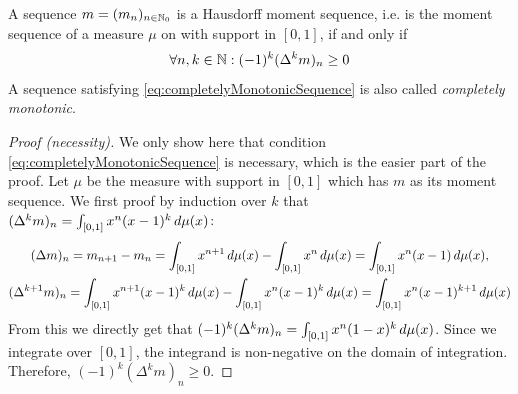 \documentclass[a4paper]{scrreprt}
\begin{document}
    \begin{thm}
        A sequence $m = (m_n)_{n \in \mathbb{N}_0}$ is a Hausdorff moment sequence, i.e. is the moment sequence of a measure $\mu$ on with support in $[0, 1]$,
        if and only if
        \begin{gather}
            \forall n, k \in \mathbb{N}: (-1)^k (\Delta^k m)_n \geq 0
            \label{eq:completelyMonotonicSequence}
        \end{gather}
        A sequence satisfying \eqref{eq:completelyMonotonicSequence} is also called \emph{completely monotonic}.
        \label{thm:hausdorffMomentSequenceCharacterization}
    \end{thm}
    \begin{proof}[Proof (necessity)]
        We only show here that condition \eqref{eq:completelyMonotonicSequence} is necessary, which is the easier part of the proof.
        Let $\mu$ be the measure with support in $[0, 1]$ which has $m$ as its moment sequence.
        We first proof by induction over $k$ that $(\Delta^k m)_n = \int_{[0, 1]} x^n (x-1)^k \, d\mu(x)$:
        \begin{gather*}
            (\Delta m)_n 
            = m_{n+1} - m_{n} 
            = \int_{[0, 1]} x^{n+1} \, d\mu(x) - \int_{[0, 1]} x^n \, d\mu(x) 
            = \int_{[0, 1]} x^n(x-1) \, d\mu(x), \\
            (\Delta^{k+1} m)_n
            = \int_{[0, 1]} x^{n+1} (x-1)^k \, d\mu(x) - \int_{[0, 1]} x^n (x-1)^k \, d\mu(x)
            = \int_{[0, 1]} x^{n}(x-1)^{k+1} \, d\mu(x)
        \end{gather*}
        From this we directly get that $(-1)^k (\Delta^k m)_n = \int_{[0, 1]} x^n (1-x)^k \, d\mu(x)$.
        Since we integrate over $[0, 1]$, the integrand is non-negative on the domain of integration.
        Therefore, $(-1)^k (\Delta^k m)_n \geq 0$.
    \end{proof}
\end{document}

